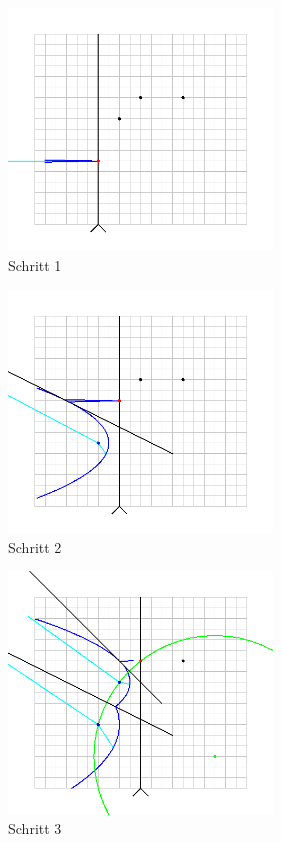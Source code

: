 \begin{figure}[h]
\begin{center}
\includegraphics[width=7cm]{capture1}
\end{center}
\caption{Schritt 1}
\label{fig:c1}
\end{figure}

\begin{figure}[h]
\begin{center}
\includegraphics[width=7cm]{capture2}
\end{center}
\caption{Schritt 2}
\label{fig:c2}
\end{figure}

\begin{figure}[h]
\begin{center}
\includegraphics[width=7cm]{capture3}
\end{center}
\caption{Schritt 3}
\label{fig:c3}
\end{figure}

